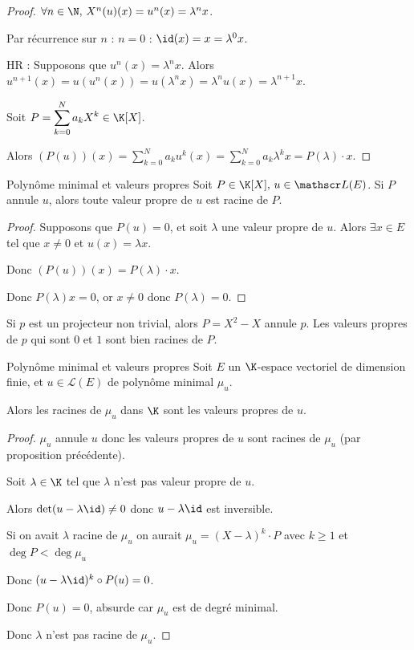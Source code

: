 \begin{proof}
    $\forall n \in \N, \, X^n(u)(x) = u^n(x) = \lambda^n x$.

    Par récurrence sur $n$ : $n = 0$ : $\id(x) = x = \lambda^0 x$.

    HR : Supposons que $u^n(x) = \lambda^n x$. Alors $u^{n + 1}(x) = u(u^n(x)) = u(\lambda^n x) = \lambda^n u(x) = \lambda^{n + 1} x$.

    Soit $P = \displaystyle \sum_{k = 0 }^{ N } a_k X^k \in \K[X]$.

    Alors $(P(u))(x) = \sum_{k = 0 }^{ N } a_k u^k(x) = \sum_{k = 0 }^{ N } a_k \lambda^k x = P(\lambda) \cdot x$.
\end{proof}

\begin{proposition}{Polynôme minimal et valeurs propres}{}
    Soit $P \in \K[X], \, u \in \mathscr L(E)$. Si $P$ annule $u$, alors toute valeur propre de 
    $u$ est racine de $P$.
\end{proposition}

\begin{proof}
    Supposons que $P(u) = 0$, et soit $\lambda $ une valeur propre de $u$. Alors 
    $\exists x \in E$ tel que $x \neq 0$ et $u(x) = \lambda x$.

    Donc $(P(u))(x) = P(\lambda) \cdot x$.

    Donc $P(\lambda)x = 0$, or $x \neq 0$ donc $P(\lambda) = 0$.
\end{proof}

\begin{exemple}
    Si $p$ est un projecteur non trivial, alors $P = X^2 -X$ annule $p$. Les valeurs propres de 
    $p$ qui sont $0$ et $1$ sont bien racines de $P$.
\end{exemple}

\begin{proposition}{Polynôme minimal et valeurs propres}{}
    Soit $E$ un $\K$-espace vectoriel de dimension finie, et $u \in \mathscr L(E)$ de polynôme minimal $\mu_u$.

    Alors les racines de $\mu_u$ dans $\K$ sont les valeurs propres de $u$.
\end{proposition}

\begin{proof}
    $\mu_u$ annule $u$ donc les valeurs propres de $u$ sont racines de $\mu_u$ (par proposition précédente).

    Soit $\lambda \in \K$ tel que $\lambda$ n'est pas valeur propre de $u$. 

    Alors $\det(u - \lambda \id) \neq 0$ donc $u - \lambda \id$ est inversible.

    Si on avait $\lambda $ racine de $\mu_u$ on aurait $\mu_u = (X - \lambda)^k \cdot P$ avec $k \geqslant 1$ et 
    $\deg P < \deg \mu_u$

    Donc $(u - \lambda \id)^k \circ P(u) = 0$. 

    Donc $P(u) = 0$, absurde car $\mu_u$ est de degré minimal.

    Donc $\lambda$ n'est pas racine de $\mu_u$.
\end{proof}

